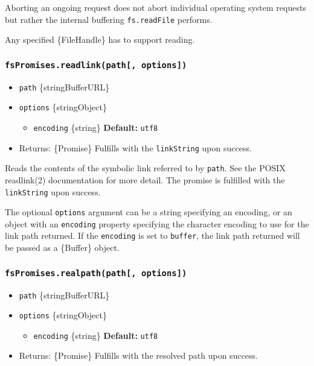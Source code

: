 Aborting an ongoing request does not abort individual operating system
requests but rather the internal buffering \texttt{fs.readFile}
performs.

Any specified \{FileHandle\} has to support reading.

\subsubsection{\texorpdfstring{\texttt{fsPromises.readlink(path{[},\ options{]})}}{fsPromises.readlink(path{[}, options{]})}}\label{fspromises.readlinkpath-options}

\begin{itemize}
\tightlist
\item
  \texttt{path} \{string\textbar Buffer\textbar URL\}
\item
  \texttt{options} \{string\textbar Object\}

  \begin{itemize}
  \tightlist
  \item
    \texttt{encoding} \{string\} \textbf{Default:}
    \texttt{\textquotesingle{}utf8\textquotesingle{}}
  \end{itemize}
\item
  Returns: \{Promise\} Fulfills with the \texttt{linkString} upon
  success.
\end{itemize}

Reads the contents of the symbolic link referred to by \texttt{path}.
See the POSIX readlink(2) documentation for more detail. The promise is
fulfilled with the \texttt{linkString} upon success.

The optional \texttt{options} argument can be a string specifying an
encoding, or an object with an \texttt{encoding} property specifying the
character encoding to use for the link path returned. If the
\texttt{encoding} is set to
\texttt{\textquotesingle{}buffer\textquotesingle{}}, the link path
returned will be passed as a \{Buffer\} object.

\subsubsection{\texorpdfstring{\texttt{fsPromises.realpath(path{[},\ options{]})}}{fsPromises.realpath(path{[}, options{]})}}\label{fspromises.realpathpath-options}

\begin{itemize}
\tightlist
\item
  \texttt{path} \{string\textbar Buffer\textbar URL\}
\item
  \texttt{options} \{string\textbar Object\}

  \begin{itemize}
  \tightlist
  \item
    \texttt{encoding} \{string\} \textbf{Default:}
    \texttt{\textquotesingle{}utf8\textquotesingle{}}
  \end{itemize}
\item
  Returns: \{Promise\} Fulfills with the resolved path upon success.
\end{itemize}

